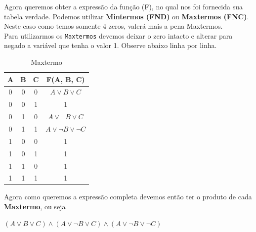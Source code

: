 \documentclass[12pt, onecolumn]{article}
\begin{document}
	Agora queremos obter a expressão da função (F), no qual nos foi fornecida
	sua tabela verdade. Podemos utilizar \textbf{Mintermos (FND)} ou 
	\textbf{Maxtermos (FNC)}. Neste caso como temos somente 4 zeros, valerá 
	mais a pena Maxtermos. \\
	\newline
	Para utilizarmos os \texttt{Maxtermos} devemos deixar o zero intacto e 
	alterar para negado a variável que tenha o valor 1. 
	Observe abaixo linha por linha. \\
	\newline
	\begin{table}[ht]
                \centering
                \begin{tabular}{|c|c|c|c|}
                        \hline
                        A & B & C & F(A, B, C)\\ \hline

                        0 & 0 & 0 & $A \lor B \lor C$ \\ \hline %
                        0 & 0 & 1 & 1 \\ \hline
			0 & 1 & 0 & $A \lor \lnot{B} \lor C$ \\ \hline %
			0 & 1 & 1 & $A \lor \lnot{B} \lor \lnot{C}$ \\ \hline %
                        1 & 0 & 0 & 1 \\ \hline
                        1 & 0 & 1 & 1 \\ \hline
                        1 & 1 & 0 & 1 \\ \hline
                        1 & 1 & 1 & 1 \\ \hline
                \end{tabular}
		\caption{Maxtermo}
        \end{table}
	
	Agora como queremos a expressão completa devemos então ter 
	o produto de cada \textbf{Maxtermo}, ou seja \\
	\begin{center} 
		$ %
		(A \lor B \lor C) \land 
		(A \lor \lnot{B} \lor C) \land 
		(A \lor \lnot{B} \lor \lnot{C})
		$ 
	\end{center} 
	
\end{document}
